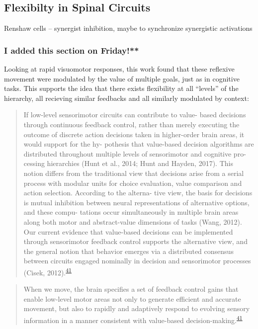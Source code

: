 \documentclass[
  a4paper,
]{article}
\begin{document}
\hypertarget{flexibilty-in-spinal-circuits}{%
\subsection{Flexibilty in Spinal
Circuits}\label{flexibilty-in-spinal-circuits}}

Renshaw cells -- synergist inhibition, maybe to synchronize synergistic
activations

\hypertarget{i-added-this-section-on-friday}{%
\subsubsection{I added this section on
Friday!**}\label{i-added-this-section-on-friday}}

Looking at rapid visuomotor responses, this work found that these
reflexive movement were modulated by the value of multiple goals, just
as in cognitive tasks. This supports the idea that there exists
flexibility at all ``levels'' of the hierarchy, all recieving similar
feedbacks and all similarly modulated by context:

\begin{quote}
If low-level sensorimotor circuits can contribute to value- based
decisions through continuous feedback control, rather than merely
executing the outcome of discrete action decisions taken in higher-order
brain areas, it would support for the hy- pothesis that value-based
decision algorithms are distributed throughout multiple levels of
sensorimotor and cognitive pro- cessing hierarchies (Hunt et al., 2014;
Hunt and Hayden, 2017). This notion differs from the traditional view
that decisions arise from a serial process with modular units for choice
evaluation, value comparison and action selection. According to the
alterna- tive view, the basis for decisions is mutual inhibition between
neural representations of alternative options, and these compu- tations
occur simultaneously in multiple brain areas along both motor and
abstract-value dimensions of tasks (Wang, 2012). Our current evidence
that value-based decisions can be implemented through sensorimotor
feedback control supports the alternative view, and the general notion
that behavior emerges via a distributed consensus between circuits
engaged nominally in decision and sensorimotor processes (Cisek,
2012).\textsuperscript{\protect\hyperlink{ref-carrollRapidVisuomotorResponses2019}{41}}
\end{quote}

\begin{quote}
When we move, the brain specifies a set of feedback control gains that
enable low-level motor areas not only to generate efficient and accurate
movement, but also to rapidly and adaptively respond to evolving sensory
information in a manner consistent with value-based
decision-making.\textsuperscript{\protect\hyperlink{ref-carrollRapidVisuomotorResponses2019}{41}}
\end{quote}
\end{document}
